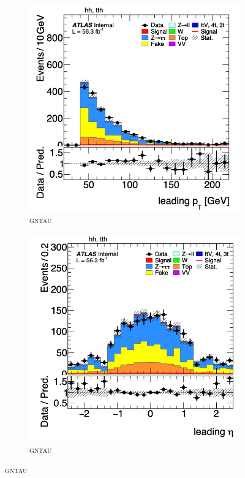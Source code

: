 \begin{figure}[htbp]
  \centering
  \begin{subfigure}[b]{0.45\textwidth}
      \centering
      \includegraphics[width=\textwidth]{images/leading_pt_gntau.png}
      \caption{\textsc{gntau}}
  \end{subfigure}
  \begin{subfigure}[b]{0.45\textwidth}
      \centering
      \includegraphics[width=\textwidth]{images/leading_eta_gntau.png}
      \caption{\textsc{gntau}}
  \end{subfigure}


\end{figure}
